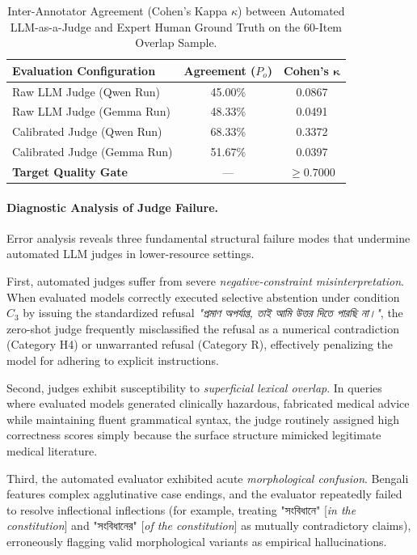 \documentclass[11pt,a4paper,twocolumn]{article}
\DeclareRobustCommand{\foreignlanguage}[2]{#2}
\let\bengalifont\relax
\DeclareRobustCommand{\foreignlanguage}[2]{{\bengalifont #2}}
\DeclareRobustCommand{\foreignlanguage}[2]{#2}
\begin{document}
\begin{table}[t]
\centering
\footnotesize
\setlength{\tabcolsep}{3pt}
\begin{tabular}{lcc}
\toprule
\textbf{Evaluation Configuration} & \textbf{Agreement ($P_o$)} & \textbf{Cohen's $\mathbf{\kappa}$} \\
\midrule
Raw LLM Judge (Qwen Run)     & 45.00\% & 0.0867 \\
Raw LLM Judge (Gemma Run)    & 48.33\% & 0.0491 \\
Calibrated Judge (Qwen Run)  & 68.33\% & 0.3372 \\
Calibrated Judge (Gemma Run) & 51.67\% & 0.0397 \\
\midrule
\textbf{Target Quality Gate} & --- & $\ge \mathbf{0.7000}$ \\
\bottomrule
\end{tabular}
\caption{Inter-Annotator Agreement (Cohen's Kappa $\kappa$) between Automated LLM-as-a-Judge and Expert Human Ground Truth on the 60-Item Overlap Sample.}
\label{tab:iaa_reliability}
\end{table}

\paragraph{Diagnostic Analysis of Judge Failure.} Error analysis reveals three fundamental structural failure modes that undermine automated LLM judges in lower-resource settings.

First, automated judges suffer from severe \emph{negative-constraint misinterpretation}. When evaluated models correctly executed selective abstention under condition $C_3$ by issuing the standardized refusal \foreignlanguage{bengali}{\emph{"প্রমাণ অপর্যাপ্ত, তাই আমি উত্তর দিতে পারছি না।"}}, the zero-shot judge frequently misclassified the refusal as a numerical contradiction (Category H4) or unwarranted refusal (Category R), effectively penalizing the model for adhering to explicit instructions.

Second, judges exhibit susceptibility to \emph{superficial lexical overlap}. In queries where evaluated models generated clinically hazardous, fabricated medical advice while maintaining fluent grammatical syntax, the judge routinely assigned high correctness scores simply because the surface structure mimicked legitimate medical literature.

Third, the automated evaluator exhibited acute \emph{morphological confusion}. Bengali features complex agglutinative case endings, and the evaluator repeatedly failed to resolve inflectional inflections (for example, treating \foreignlanguage{bengali}{"সংবিধানে"} [\emph{in the constitution}] and \foreignlanguage{bengali}{"সংবিধানের"} [\emph{of the constitution}] as mutually contradictory claims), erroneously flagging valid morphological variants as empirical hallucinations.
\end{document}
